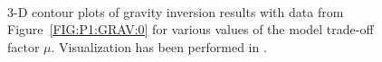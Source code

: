 \begin{figure}
\begin{center}
{        }\\ %
    \end{center}
    \caption{3-D contour plots of gravity inversion results with data from
    Figure~\ref{FIG:P1:GRAV:0} for various values of the model trade-off
    factor $\mu$. Visualization has been performed in \VisIt.
    }
    \label{FIG:P1:GRAV:10}
\end{figure}

